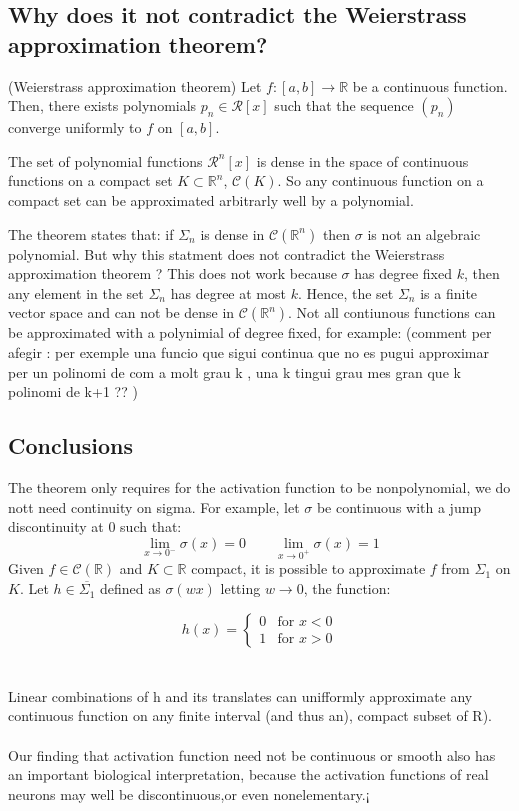 \documentclass[../main.tex]{subfiles}
\begin{document}
\subsection{Why does it not contradict the Weierstrass approximation theorem? }
\begin{theorem}(Weierstrass  approximation theorem)
	Let $f:[a,b]\rightarrow \mathbb{R} $ be a continuous function. Then, there exists polynomials $p_n\in \mathcal{R}[x]$ such that the sequence $(p_n)$ converge uniformly to $f$ on $[a,b]$. 
\end{theorem} 

\begin{corolari}
	The set of polynomial functions $\mathcal{R}^n[x]$ is dense in the space of continuous functions on a compact set $K \subset \mathbb{R}^n$, $\mathcal{C}(K)$. So any continuous function on a compact set can be approximated arbitrarly well by a polynomial. 
\end{corolari}

\noindent The theorem states that: if $\Sigma_n$ is dense in $\mathcal{C}(\mathbb{R}^n)$ then $\sigma$ is not an algebraic polynomial. But why this statment does not contradict the Weierstrass approximation theorem ?
This does not work because $\sigma$ has degree fixed $k$, then any element in the set $\Sigma_n$ has degree at most $k$. Hence, the set $\Sigma_n$ is a finite vector space and can not be dense in $\mathcal{C}(\mathbb{R}^n)$. Not all contiunous functions can be approximated with a polynimial of degree fixed, for example: 
(comment per afegir : per exemple una funcio que sigui continua que no es pugui approximar per un polinomi de com a molt grau k , una k tingui grau mes gran que k polinomi de k+1 ?? )


\subsection{Conclusions}


	\noindent The theorem only requires for the activation function to be nonpolynomial, we do nott need continuity on sigma. For example, let $\sigma$ be continuous with a jump discontinuity at 0 such that: $$\lim_{x\to 0^-} \sigma(x)=0 \qquad \lim_{x \to 0^+} \sigma(x) =1$$
	Given $f \in \mathcal{C}(\mathbb{R})$ and $K \subset \mathbb{R}$ compact, it is possible to approximate $f$ from $\Sigma_1 $ on $K$. Let $h\in \overline{\Sigma_1}$ defined as $\sigma(wx)$ letting $w \rightarrow 0$, the function:
	
	\[
	h(x) = \begin{cases} 
		0 & \text{for } x < 0 \\
		1 & \text{for } x > 0 
	\end{cases}
	\] \\ \\ 
	Linear combinations of h and its translates can unifformly approximate any continuous function on any finite interval (and thus an), compact subset of R).
	\\ \\
	Our finding that activation function need not be continuous or smooth also has an important biological interpretation, because the activation functions of real neurons may well be discontinuous,or even nonelementary.¡
\end{document}
